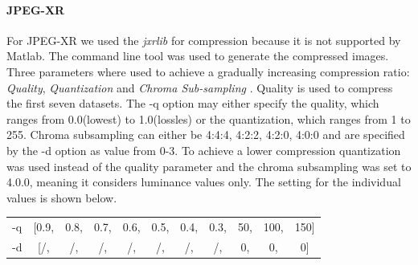 \documentclass[10pt,a4paper]{article}
\begin{document}
\paragraph{JPEG-XR} For JPEG-XR we used the \textit{jxrlib} for compression because it is not supported by Matlab. The command line tool was used to generate the compressed images. Three parameters where used to achieve a gradually increasing compression ratio: \textit{Quality}, \textit{Quantization} and \textit{Chroma Sub-sampling }. Quality is used to compress the first seven datasets. The -q option may either specify the quality, which ranges from 0.0(lowest) to 1.0(lossles) or the quantization, which ranges from 1 to 255. Chroma subsampling can either be 4:4:4, 4:2:2, 4:2:0, 4:0:0 and are specified by the -d option as value from 0-3. To achieve a lower compression quantization was used instead of the quality parameter and the chroma subsampling was set to 4.0.0, meaning it considers			luminance values only. The setting for the individual values is shown below.\\
\begin{center}
	\begin{tabular}{l|cccccccccc}
		-q&[0.9,&0.8,&0.7,&0.6,&0.5,&0.4,&0.3,&50,&100,&150]\\	
		-d&[/,&/,&/,&/,&/,&/,&/,&0,&0,&0]\\
	\end{tabular}
\end{center}
\end{document}
